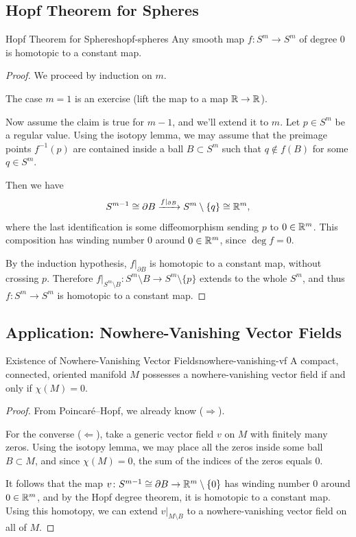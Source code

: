 \subsection{Hopf Theorem for Spheres}

\begin{theorem}{Hopf Theorem for Spheres}{hopf-spheres}
    Any smooth map $f \colon S^m \to S^m$ of degree $0$ is homotopic to a constant map.
\end{theorem}

\begin{proof}
    We proceed by induction on $m$.

    The case $m = 1$ is an exercise (lift the map to a map $\mathbb{R} \to \mathbb{R}$).

    Now assume the claim is true for $m - 1$, and we'll extend it to $m$. Let $p \in S^m$ be a regular value. Using the isotopy lemma, we may assume that the preimage points $f^{-1}(p)$ are contained inside a ball $B \subset S^m$ such that $q \notin f(B)$ for some $q \in S^m$.

    Then we have
    \[
        S^{m-1} \cong \partial B \xrightarrow{f|_{\partial B}} S^m \setminus \{q\} \cong \mathbb{R}^m,
    \]
    where the last identification is some diffeomorphism sending $p$ to $0 \in \mathbb{R}^m$. This composition has winding number $0$ around $0 \in \mathbb{R}^m$, since $\deg f = 0$.

    By the induction hypothesis, $f|_{\partial B}$ is homotopic to a constant map, without crossing $p$. Therefore $f|_{S^m \setminus B} \colon S^m \setminus B \to S^m \setminus \{p\}$ extends to the whole $S^m$, and thus $f \colon S^m \to S^m$ is homotopic to a constant map.
\end{proof}

\subsection{Application: Nowhere-Vanishing Vector Fields}

\begin{theorem}{Existence of Nowhere-Vanishing Vector Fields}{nowhere-vanishing-vf}
    A compact, connected, oriented manifold $M$ possesses a nowhere-vanishing vector field if and only if $\chi(M) = 0$.
\end{theorem}

\begin{proof}
    From Poincar\'e--Hopf, we already know ($\Rightarrow$).

    For the converse ($\Leftarrow$), take a generic vector field $v$ on $M$ with finitely many zeros. Using the isotopy lemma, we may place all the zeros inside some ball $B \subset M$, and since $\chi(M) = 0$, the sum of the indices of the zeros equals $0$.

    It follows that the map $v \colon S^{m-1} \cong \partial B \to \mathbb{R}^m \setminus \{0\}$ has winding number $0$ around $0 \in \mathbb{R}^m$, and by the Hopf degree theorem, it is homotopic to a constant map. Using this homotopy, we can extend $v|_{M \setminus B}$ to a nowhere-vanishing vector field on all of $M$.
\end{proof}

